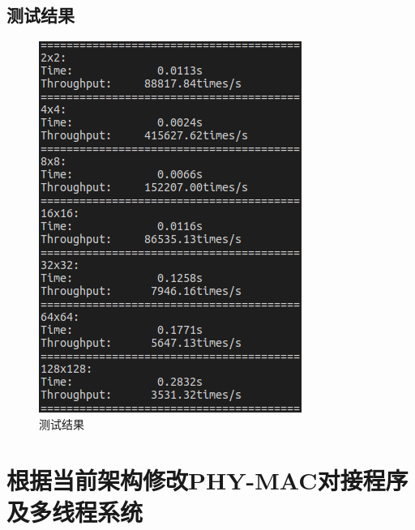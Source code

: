 \documentclass{article}
\begin{document}
\subsection{测试结果}
\begin{figure}[H]
	\centering
	\includegraphics[width = .6\textwidth]{rzf.png}
	\caption{测试结果}
\end{figure}

\section{根据当前架构修改PHY-MAC对接程序及多线程系统}






\end{document}

